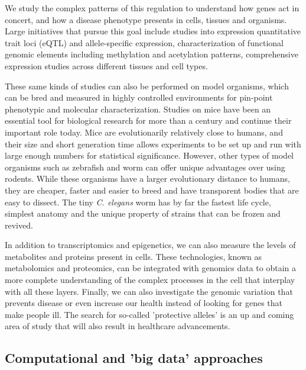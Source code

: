 We study the complex patterns of this regulation to understand how genes act in concert, and how a disease phenotype presents in cells, tissues and organisms.
Large initiatives that pursue this goal include studies into expression quantitative trait loci (eQTL)\cite{Westra_2013} and allele-specific expression\cite{Deelen_2015}, characterization of functional genomic elements including methylation and acetylation patterns\cite{Dunham_2012}, comprehensive expression studies across different tissues\cite{Lonsdale_2013} and cell types\cite{Forrest_2014}.

These same kinds of studies can also be performed on model organisms, which can be bred and measured in highly controlled environments for pin-point phenotypic and molecular characterization.
Studies on mice have been an essential tool for biological research for more than a century and continue their important role today\cite{Phifer_Rixey_2015}.
Mice are evolutionarily relatively close to humans, and their size and short generation time allows experiments to be set up and run with large enough numbers for statistical significance.
However, other types of model organisms such as zebrafish\cite{Lieschke_2007} and worm\cite{Kaletta_2006} can offer unique advantages over using rodents.
While these organisms have a larger evolutionary distance to humans, they are cheaper, faster and easier to breed and have transparent bodies that are easy to dissect.
The tiny \textsl{C. elegans} worm has by far the fastest life cycle, simplest anatomy and the unique property of strains that can be frozen and revived.

In addition to transcriptomics and epigenetics, we can also measure the levels of metabolites and proteins present in cells.
These technologies, known as metabolomics and proteomics, can be integrated with genomics data\cite{Grapov_2015} to obtain a more complete understanding of the complex processes in the cell that interplay with all these layers.
Finally, we can also investigate the genomic variation that prevents disease or even increase our health instead of looking for genes that make people ill.
The search for so-called 'protective alleles' is an up and coming area of study that will also result in healthcare advancements\cite{Harper_2015}.

\subsection{Computational and 'big data' approaches}


